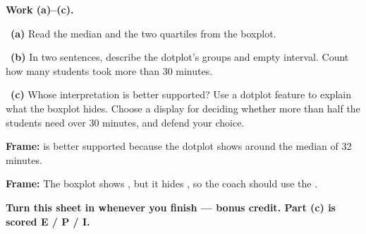 \documentclass[11pt]{article}
\begin{document}
\newpage
\textbf{Work (a)--(c).}\par\smallskip

~\textbf{(a)} Read the median and the two quartiles from the boxplot.\par
\workspace{0.7in}

~\textbf{(b)} In two sentences, describe the dotplot's groups and empty interval. Count how many students took more than 30 minutes.\par
\workspace{1.4in}

~\textbf{(c)} Whose interpretation is better supported? Use a dotplot feature to explain what the boxplot hides. Choose a display for deciding whether more than half the students need over 30 minutes, and defend your choice.\par
\workspace{2.0in}

\begin{sentenceframebox}\raggedright\textbf{Frame:} \blank[0.8in] is better supported because the dotplot shows \blank[2.2in] around the median of 32 minutes.\end{sentenceframebox}

\begin{sentenceframebox}\raggedright\textbf{Frame:} The boxplot shows \blank[1.4in], but it hides \blank[1.8in], so the coach should use the \blank[0.8in].\end{sentenceframebox}

\textbf{Turn this sheet in whenever you finish --- bonus credit. Part (c) is scored E / P / I.}\par
\end{document}
